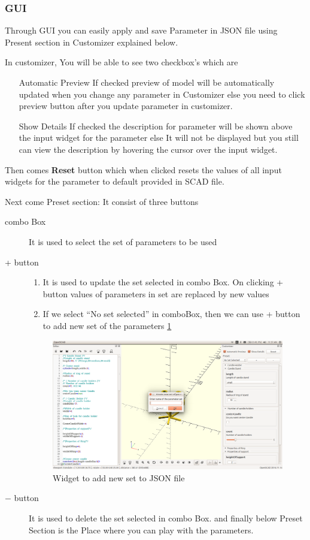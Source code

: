 \subsubsection{GUI}

Through GUI you can easily apply and save Parameter in JSON file using Present section in Customizer explained below. 

In customizer, You will be able to see two checkbox’s which are
\begin{itemize}
\item [Automatic Preview] 
If checked preview of model will be automatically updated when you change any parameter in Customizer else you need to click preview button after you update parameter in customizer.
\item [Show Details] 
If checked the description for parameter will be shown above the input widget for the parameter else It will not be displayed but you still can view the description by hovering the cursor over the input widget.
\end{itemize}
Then comes \textbf{Reset} button which when clicked resets the values of all input widgets for the parameter to default provided in SCAD file.

Next come Preset section: It consist of three buttons
\begin{description}
	\item[combo Box] 
		It is used to select the set of parameters to be used
	\item[+ button]
	\begin{enumerate}
		\item It is used to update the set selected in combo Box. On clicking + button values of parameters in set are replaced by new values
		\item If we select “No set selected” in comboBox, then we can use + button to add new set of the parameters \ref{fig:Add new set}
	\end{enumerate}
	\begin{figure}[H] 
		\centering \includegraphics[scale=0.31]{images/output/7.png}
		\caption{Widget to add new set to JSON file}
		\label{fig:Add new set}
	\end{figure}

	\item [$-$ button] 
		It is used to delete the set selected in combo Box.
	and finally below Preset Section is the Place where you can play with the parameters.
\end{description}


